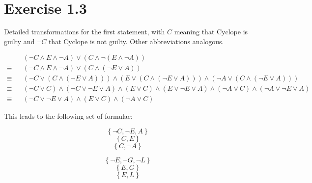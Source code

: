 \documentclass[a4paper]{article}
\begin{document}
\pagebreak


\section{Exercise 1.3}

Detailed transformations for the first statement, with $C$ meaning that Cyclope is guilty and
$\lnot C$ that Cyclope is not guilty. Other abbreviations analogous.


\begin{equation*}
\begin{aligned}
           & & \left( \lnot C \land E \land \lnot A \right) \lor \left( C \land \lnot \left( E \land \lnot A \right) \right) \\
    \equiv & & \left( \lnot C \land E \land \lnot A \right) \lor \left( C \land \left( \lnot E \lor A \right) \right) \\
    \equiv & & \left( \lnot C \lor \left( C \land \left( \lnot E \lor A \right) \right) \right)
               \land \left( E \lor \left( C \land \left( \lnot E \lor A \right) \right) \right)
               \land \left( \lnot A \lor \left( C \land \left( \lnot E \lor A \right) \right) \right) \\
    \equiv & & \left( \lnot C \lor C \right) \land \left( \lnot C \lor \lnot E \lor A \right)
               \land \left( E \lor C \right) \land \left( E \lor \lnot E \lor A \right)
               \land \left( \lnot A \lor C \right) \land \left( \lnot A \lor \lnot E \lor A \right) \\
    \equiv & & \left( \lnot C \lor \lnot E \lor A \right) \land \left( E \lor C \right) \land \left( \lnot A \lor C \right)
\end{aligned}
\end{equation*}

This leads to the following set of formulae:

\begin{equation}
 \left\{ \lnot C , \lnot E , A \right\} \tag{1.1} \label{1.1}
\end{equation}
\begin{equation}
\left\{ C , E \right\} \tag{1.2} \label{1.2}
\end{equation}
\begin{equation}
\left\{ C , \lnot A \right\} \tag{1.3} \label{1.3}
\end{equation}

\begin{equation}
 \left\{ \lnot E , \lnot G , \lnot L \right\} \tag{2.1} \label{2.1}
\end{equation}
\begin{equation}
\left\{ E , G \right\} \tag{2.2} \label{2.2}
\end{equation}
\begin{equation}
\left\{ E , L \right\} \tag{2.3} \label{2.3}
\end{equation}
\end{document}
